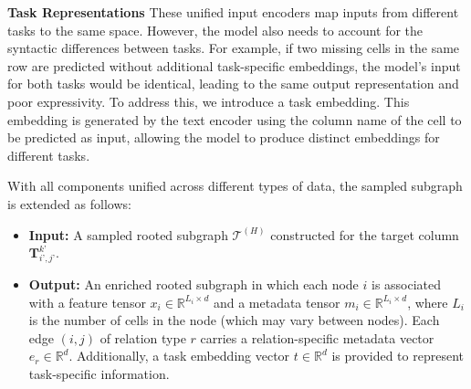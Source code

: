 \documentclass{article}
\theoremstyle{plain}
\theoremstyle{definition}
\theoremstyle{remark}
\begin{document}
\textbf{Task Representations}
These unified input encoders map inputs from different tasks to the same space. However, the model also needs to account for the syntactic differences between tasks. For example, if two missing cells in the same row are predicted without additional task-specific embeddings, the model’s input for both tasks would be identical, leading to the same output representation and poor expressivity. To address this, we introduce a task embedding. This embedding is generated by the text encoder using the column name of the cell to be predicted as input, allowing the model to produce distinct embeddings for different tasks.


With all components unified across different types of data, the sampled subgraph is extended as follows:
\begin{itemize}
[itemsep=2pt,topsep=-2pt,parsep=0pt,leftmargin=10pt]
\item \textbf{Input:} A sampled rooted subgraph $\mathcal{T}^{(H)}$ constructed for the target column $\bm{T}^{k’}_{i’, j’}$.
\item \textbf{Output:} An enriched rooted subgraph in which each node $i$ is associated with a feature tensor $x_i \in \mathbb{R}^{L_i \times d}$ and a metadata tensor $m_i \in \mathbb{R}^{L_i \times d}$, where $L_i$ is the number of cells in the node (which may vary between nodes). Each edge $(i, j)$ of relation type $r$ carries a relation-specific metadata vector $e_r \in \mathbb{R}^d$. Additionally, a task embedding vector $t \in \mathbb{R}^d$ is provided to represent task-specific information.
\end{itemize}





\end{document}
